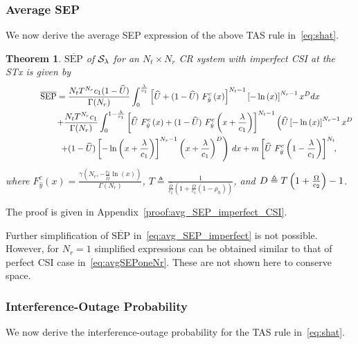 \documentclass[12pt,draftcls,peerreview,onecolumn]{IEEEtran}
\newtheorem{theorem}{{\bf Theorem}}
\newcommand{\define}{\triangleq}
\newcommand{\SEP}{\text{SEP}}
\newcommand{\lam}{\lambda}
\newcommand{\Nt}{{N_t}}
\newcommand{\Nr}{{N_r}}
\newcommand{\cone}{c_{1}}
\newcommand{\ctwo}{c_{2}}
\newcommand{\m}{\cone}
\newcommand{\lambym}{\frac{\lam}{\m}}
\newcommand{\al}{\ctwo}
\newcommand{\snr}{\Omega}
\newcommand{\snrbyal}[1][]{\frac{\snr#1}{\al}}
\newcommand{\un}{U}
\newcommand{\callamrule}{{\cal S_{{\lam}}}}
\newcommand{\avgSEP}{\overline{\SEP}}
\newcommand{\unhat}{\widehat{\un}}
\newcommand{\snrhat}{\widehat{\snr}}
\newcommand{\yhat}{\hat{y}}
\newcommand{\albysnrhat}[1][]{\frac{\al#1}{\snrhat}}
\newcommand{\snrhatbyal}[1][]{\frac{\snrhat#1}{\al}}
\newcommand{\rhoh}{\rho_h}
\newcommand{\Tc}{\frac{1}{\snrhatbyal\left(1 + \snrbyal\left(1 - \rhoh \right)  \right) }}
\newcommand{\T}{T}
\newcommand{\Dc}{\T \left( 1 + \snrbyal\right) -1}
\begin{document}
\newcommand{\avgSEPhat}{\widehat{\SEP}}

\subsubsection{ Average SEP} We now derive the average SEP expression of the above TAS rule in~\eqref{eq:shat}. %

\begin{theorem}
\label{thm:avg_SEP_imperfect}
$\avgSEP$ of $\callamrule$ for an $\Nt\times\Nr$ CR system with imperfect CSI at the STx is given by
\begin{multline}
\label{eq:avg_SEP_imperfect}
\avgSEP = \frac{\Nt \T^{\Nr}\m(1-\unhat)}{\Gamma(\Nr)} \int_{0}^{\lambym} \left[\unhat + \unccdfyhat{(1-\unhat)}{x}\right]^{\Nt-1} \yhattimespdfyNr dx\\
\hspace{60pt} + \frac{\Nt \T^{\Nr}\m}{\Gamma(\Nr)} \int_{0}^{1-\lambym}
\left[\unccdfyhat{\unhat}{x} + \unccdfyhat{(1-\unhat)}{x+\lambym} \right]^{\Nt-1} \left(\unhat\yhattimespdfyNr \right. \\ 
\hspace{40pt}\left. + (1-\unhat)\yhatpluslamtimespdfyNr\right)\, dx 
+m\left[\unccdfyhat{\unhat}{1-\lambym}\right]^{\Nt}\!\!,\!\!
\end{multline}
where $F_{\yhat}^{c}\left(x\right) = \frac{\gamma\left(\Nr,-\albysnrhat[]\ln(x)\right)}{\Gamma(\Nr)}$, $\T \define \Tc$, and $\D \define \Dc$.	
\end{theorem}
\begin{IEEEproof}
	The proof is given in Appendix~\ref{proof:avg_SEP_imperfect_CSI}.
\end{IEEEproof}

Further simplification of $\avgSEP$ in~\eqref{eq:avg_SEP_imperfect} is not possible. However, for $\Nr=1$ simplified expressions can be obtained similar to that of perfect CSI case in~\eqref{eq:avgSEPoneNr}. These are not shown here to conserve space.



\subsubsection{ Interference-Outage Probability} We now derive the interference-outage probability for the TAS rule in~\eqref{eq:shat}.
\end{document}
